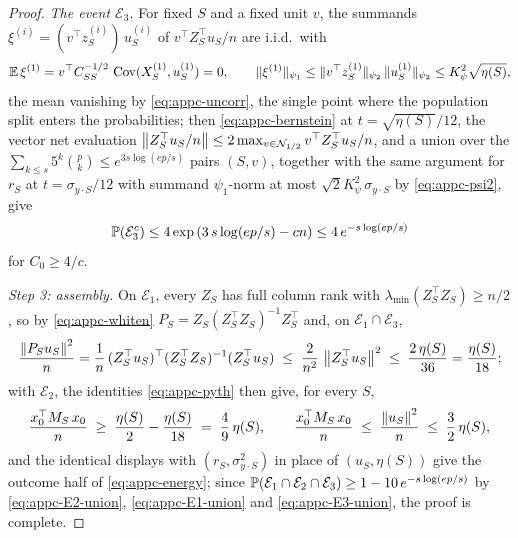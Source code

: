 \begin{proof}
{\emph{The event $\mathcal E_3$.} For fixed $S$ and a fixed unit $v$,
the summands $\xi^{(i)} = ( v^\top z_S^{(i)} )\, u_S^{(i)}$ of
$v^\top Z_S^\top u_S / n$ are i.i.d.\ with
\begin{equation}\label{eq:appc-E3-mean}
        \mathbb{E}\, \xi^{(1)}
        =
        v^\top C_{SS}^{-1/2}\, \operatorname{Cov}( X_S^{(1)}, u_S^{(1)} )
        =
        0,
        \qquad
        \| \xi^{(1)} \|_{\psi_1}
        \le
        \| v^\top z_S^{(1)} \|_{\psi_2}\, \| u_S^{(1)} \|_{\psi_2}
        \le
        K_\psi^2 \sqrt{\eta(S)},
\end{equation}
the mean vanishing by \eqref{eq:appc-uncorr}, the single point where
the population split enters the probabilities; then
\eqref{eq:appc-bernstein} at $t = \sqrt{\eta(S)}/12$, the vector net
evaluation
$\left\lVert  Z_S^\top u_S / n  \right\rVert
\le 2 \max_{v \in \mathcal N_{1/2}} v^\top Z_S^\top u_S / n$,
and a union over the
$\sum_{k \le s} 5^{k} \binom{p}{k} \le e^{3 s \log(ep/s)}$ pairs
$(S, v)$, together with the same argument for $r_S$ at
$t = \sigma_{y \cdot S} / 12$ with summand $\psi_1$-norm at most
$\sqrt 2 K_\psi^2\, \sigma_{y \cdot S}$ by \eqref{eq:appc-psi2}, give
\begin{equation}\label{eq:appc-E3-union}
        \mathbb{P}( \mathcal E_3^c )
        \le 4 \exp\left( 3\, s \log(ep/s) - c n \right)
        \le 4\, e^{- s \log(ep/s)}
\end{equation}
for $C_0 \ge 4/c$.

\emph{Step 3: assembly.} On $\mathcal E_1$, every $Z_S$ has full column
rank with $\lambda_{\min}( Z_S^\top Z_S ) \ge n/2$, so by
\eqref{eq:appc-whiten} $P_S = Z_S ( Z_S^\top Z_S )^{-1} Z_S^\top$ and,
on $\mathcal E_1 \cap \mathcal E_3$,
\begin{equation}\label{eq:appc-proj-small}
        \frac{ \left\lVert  P_S u_S  \right\rVert^2 }{n}
        =
        \frac1n\, ( Z_S^\top u_S )^\top ( Z_S^\top Z_S )^{-1}
        ( Z_S^\top u_S )
        \;\le\;
        \frac{2}{n^2}\, \left\lVert  Z_S^\top u_S  \right\rVert^2
        \;\le\;
        \frac{2\, \eta(S)}{36}
        =
        \frac{\eta(S)}{18};
\end{equation}
with $\mathcal E_2$, the identities \eqref{eq:appc-pyth} then give,
for every $S$,
\begin{equation}\label{eq:appc-x-bracket}
        \frac{x_0^\top M_S\, x_0}{n}
        \;\ge\;
        \frac{\eta(S)}{2} - \frac{\eta(S)}{18}
        \;=\;
        \frac{4}{9}\, \eta(S),
        \qquad
        \frac{x_0^\top M_S\, x_0}{n}
        \;\le\;
        \frac{ \left\lVert u_S \right\rVert^2 }{n}
        \;\le\;
        \frac{3}{2}\, \eta(S),
\end{equation}
and the identical displays with $( r_S, \sigma_{y \cdot S}^2 )$ in
place of $( u_S, \eta(S) )$ give the outcome half of
\eqref{eq:appc-energy}; since
$\mathbb{P}( \mathcal E_1 \cap \mathcal E_2 \cap \mathcal E_3 )
\ge 1 - 10\, e^{- s \log(ep/s)}$
by \eqref{eq:appc-E2-union}, \eqref{eq:appc-E1-union}
and \eqref{eq:appc-E3-union}, the proof is complete.}
\end{proof}

